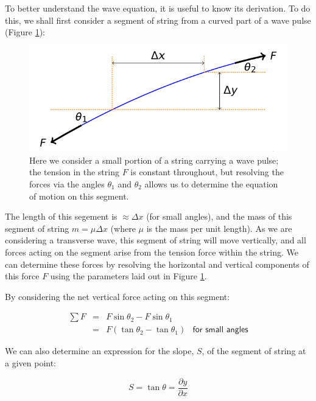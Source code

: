 \documentclass[
]{book}
\begin{document}
To better understand the wave equation, it is useful to know its derivation. To do this, we shall first consider a segment of string from a curved part of a wave pulse (Figure \ref{fig:ch6-waveeqnderiv1}):

\begin{figure}

{\centering \includegraphics[width=0.7\linewidth]{visualisations/LaTeX/ch6-waveequationderiv1} 

}

\caption{Here we consider a small portion of a string carrying a wave pulse; the tension in the string $F$ is constant throughout, but resolving the forces via the angles $\theta_1$ and $\theta_2$ allows us to determine the equation of motion on this segment. }\label{fig:ch6-waveeqnderiv1}
\end{figure}

The length of this segement is \(\approx \Delta x\) (for small angles), and the mass of this segment of string \(m = \mu \Delta x\) (where \(\mu\) is the mass per unit length). As we are considering a transverse wave, this segment of string will move vertically, and all forces acting on the segment arise from the tension force within the string. We can determine these forces by resolving the horizontal and vertical components of this force \(F\) using the parameters laid out in Figure \ref{fig:ch6-waveeqnderiv1}.

By considering the net vertical force acting on this segment:

\begin{equation}
\begin{array}{rcll}
\sum F &=& F \sin \theta_2 - F \sin \theta_1 &\\
&=& F \left( \tan \theta_2 - \tan \theta_1 \right) & \textsf{for small angles}
\end{array}
\label{eq:ch6-waveeqnderiv1}
\end{equation}

We can also determine an expression for the slope, \(S\), of the segment of string at a given point:

\begin{equation}
S = \tan \theta = \frac{\partial y}{\partial x}
\label{eq:ch6-waveeqnderiv2}
\end{equation}
\end{document}
